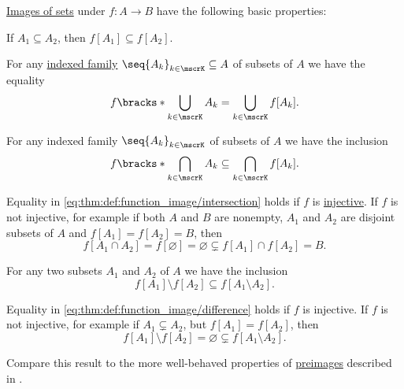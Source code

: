 \begin{proposition}\label{thm:def:function_image}
  \hyperref[def:multi_valued_function/set_value]{Images of sets} under \( f: A \to B \) have the following basic properties:
  \begin{thmenum}
     If \( A_1 \subseteq A_2 \), then \( f[A_1] \subseteq f[A_2] \).

     For any \hyperref[def:cartesian_product/indexed_family]{indexed family} \( \seq{ A_k }_{k \in \mscrK} \subseteq A \) of subsets of \( A \) we have the equality
    \begin{equation}\label{eq:thm:def:function_image/union}
      f\bracks*{ \bigcup_{k \in \mscrK} A_k } = \bigcup_{k \in \mscrK} f[A_k].
    \end{equation}

     For any indexed family \( \seq{ A_k }_{k \in \mscrK} \) of subsets of \( A \) we have the inclusion
    \begin{equation}\label{eq:thm:def:function_image/intersection}
      f\bracks*{ \bigcap_{k \in \mscrK} A_k } \subseteq \bigcap_{k \in \mscrK} f[A_k].
    \end{equation}

    Equality in \eqref{eq:thm:def:function_image/intersection} holds if \( f \) is \hyperref[def:function_invertibility/injective]{injective}. If \( f \) is not injective, for example if both \( A \) and \( B \) are nonempty, \( A_1 \) and \( A_2 \) are disjoint subsets of \( A \) and \( f[A_1] = f[A_2] = B \), then
    \begin{equation*}
      f[A_1 \cap A_2] = f[\varnothing] = \varnothing \subsetneq f[A_1] \cap f[A_2] = B.
    \end{equation*}

     For any two subsets \( A_1 \) and \( A_2 \) of \( A \) we have the inclusion
    \begin{equation}\label{eq:thm:def:function_image/difference}
      f[A_1] \setminus f[A_2] \subseteq f[A_1 \setminus A_2].
    \end{equation}

    Equality in \eqref{eq:thm:def:function_image/difference} holds if \( f \) is injective. If \( f \) is not injective, for example if \( A_1 \subsetneq A_2 \), but \( f[A_1] = f[A_2] \), then
    \begin{equation*}
      f[A_1] \setminus f[A_2] = \varnothing \subsetneq f[A_1 \setminus A_2].
    \end{equation*}
  \end{thmenum}

  Compare this result to the more well-behaved properties of \hyperref[thm:def:function/preimage]{preimages} described in .
\end{proposition}
